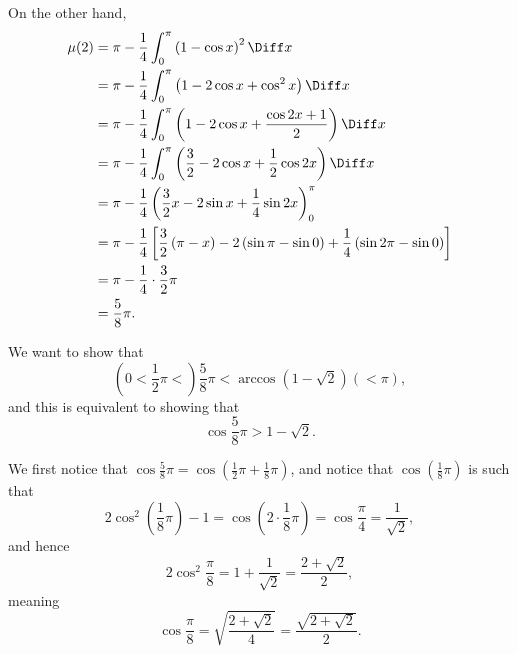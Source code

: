 \begin{enumerate}
\begin{enumerate}
                    On the other hand,
                    \begin{align*}
                        \mu(2) & = \pi - \frac{1}{4} \int_{0}^{\pi} \left(1 - \cos x\right)^2 \Diff x                                                                               \\
                               & = \pi - \frac{1}{4} \int_{0}^{\pi} \left(1 - 2 \cos x + \cos^2 x\right) \Diff x                                                                    \\
                               & = \pi - \frac{1}{4} \int_{0}^{\pi} \left(1 - 2 \cos x + \frac{\cos 2x + 1}{2}\right) \Diff x                                                       \\
                               & = \pi - \frac{1}{4} \int_{0}^{\pi} \left(\frac{3}{2} - 2 \cos x + \frac{1}{2} \cos 2x\right) \Diff x                                               \\
                               & = \pi - \frac{1}{4} \left(\frac{3}{2} x - 2 \sin x + \frac{1}{4} \sin 2x\right)_{0}^{\pi}                                                          \\
                               & = \pi - \frac{1}{4} \left[\frac{3}{2} \left(\pi - x\right) - 2 \left(\sin \pi - \sin 0\right) + \frac{1}{4} \left(\sin 2\pi - \sin 0\right)\right] \\
                               & = \pi - \frac{1}{4} \cdot \frac{3}{2} \pi                                                                                                          \\
                               & = \frac{5}{8} \pi.
                    \end{align*}

                    We want to show that
                    \[
                        \left(0 < \frac{1}{2}\pi < \right) \frac{5}{8} \pi < \arccos \left(1 - \sqrt{2}\right) \left(< \pi\right),
                    \]
                    and this is equivalent to showing that
                    \[
                        \cos \frac{5}{8}\pi > 1 - \sqrt{2}.
                    \]

                    We first notice that \(\cos \frac{5}{8}\pi = \cos \left(\frac{1}{2}\pi + \frac{1}{8}\pi\right)\), and notice that \(\cos \left(\frac{1}{8}\pi \right)\) is such that
                    \[
                        2 \cos^2 \left(\frac{1}{8} \pi\right) - 1 = \cos \left(2 \cdot \frac{1}{8}\pi\right) = \cos \frac{\pi}{4} = \frac{1}{\sqrt{2}},
                    \]
                    and hence
                    \[
                        2 \cos^2 \frac{\pi}{8} = 1 + \frac{1}{\sqrt{2}} = \frac{2 + \sqrt{2}}{2},
                    \]
                    meaning
                    \[
                        \cos \frac{\pi}{8} = \sqrt{\frac{2 + \sqrt{2}}{4}} = \frac{\sqrt{2 + \sqrt{2}}}{2}.
                    \]


\end{enumerate}
\end{enumerate}
